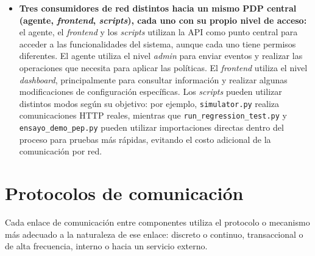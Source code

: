 \begin{itemize}
	\item \textbf{Tres consumidores de red distintos hacia un mismo PDP central (agente, \emph{frontend}, \emph{scripts}), cada uno con su propio nivel de acceso:} el agente, el \emph{frontend} y los \emph{scripts} utilizan la API como punto central para acceder a las funcionalidades del sistema, aunque cada uno tiene permisos diferentes. El agente utiliza el nivel \emph{admin} para enviar eventos y realizar las operaciones que necesita para aplicar las políticas. El \emph{frontend} utiliza el nivel \emph{dashboard}, principalmente para consultar información y realizar algunas modificaciones de configuración específicas. Los \emph{scripts} pueden utilizar distintos modos según su objetivo: por ejemplo, \texttt{simulator.py} realiza comunicaciones HTTP reales, mientras que \texttt{run\_regression\_test.py} y \texttt{ensayo\_demo\_pep.py} pueden utilizar importaciones directas dentro del proceso para pruebas más rápidas, evitando el costo adicional de la comunicación por red.
\end{itemize}

\section{Protocolos de comunicación}
Cada enlace de comunicación entre componentes utiliza el protocolo o mecanismo más adecuado a la naturaleza de ese enlace: discreto o continuo, transaccional o de alta frecuencia, interno o hacia un servicio externo.

